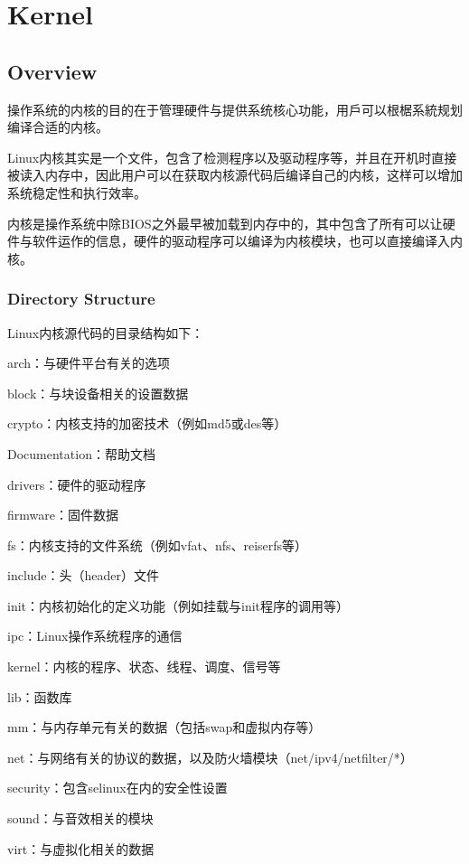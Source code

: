 \part{Kernel}

\chapter{Overview}

操作系统的内核的目的在于管理硬件与提供系统核心功能，用戶可以根椐系統规划编译合适的内核。




Linux内核其实是一个文件，包含了检测程序以及驱动程序等，并且在开机时直接被读入内存中，因此用户可以在获取内核源代码后编译自己的内核，这样可以增加系统稳定性和执行效率。

内核是操作系统中除BIOS之外最早被加载到内存中的，其中包含了所有可以让硬件与软件运作的信息，硬件的驱动程序可以编译为内核模块，也可以直接编译入内核。


\section{Directory Structure}


Linux内核源代码的目录结构如下：

\begin{compactitem}
\item arch：与硬件平台有关的选项
\item block：与块设备相关的设置数据
\item crypto：内核支持的加密技术（例如md5或des等）
\item Documentation：帮助文档
\item drivers：硬件的驱动程序
\item firmware：固件数据
\item fs：内核支持的文件系统（例如vfat、nfs、reiserfs等）
\item include：头（header）文件
\item init：内核初始化的定义功能（例如挂载与init程序的调用等）
\item ipc：Linux操作系统程序的通信
\item kernel：内核的程序、状态、线程、调度、信号等
\item lib：函数库
\item mm：与内存单元有关的数据（包括swap和虚拟内存等）
\item net：与网络有关的协议的数据，以及防火墙模块（net/ipv4/netfilter/*）
\item security：包含selinux在内的安全性设置
\item sound：与音效相关的模块
\item virt：与虚拟化相关的数据
\end{compactitem}

